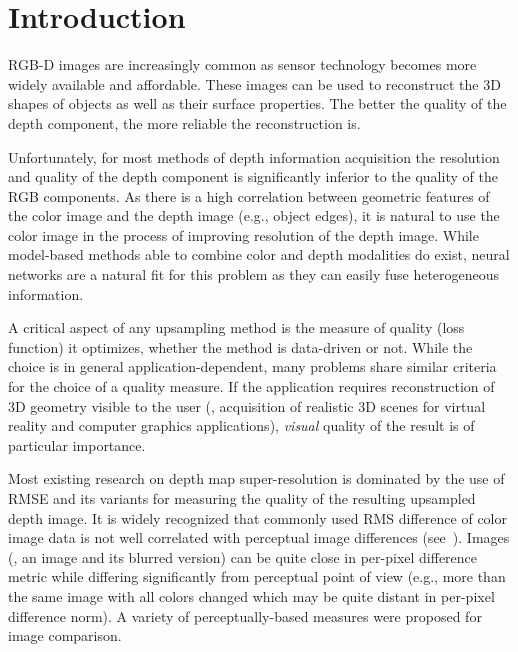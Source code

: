 \section{Introduction}
\label{sec:intro}

RGB-D images are increasingly common as sensor technology becomes more widely available and affordable. These images can be used to reconstruct the 3D shapes of objects as well as their surface properties. The better the quality of the depth component, the more reliable the reconstruction is. 

Unfortunately, for most methods of depth information acquisition the resolution and quality of the depth component is significantly inferior to the quality of the RGB components. As there is a high correlation between geometric features of the color image and the depth image (e.g., object edges), it is natural to use the color image in the process of improving resolution of the depth image. While model-based methods able to combine color and depth modalities do exist, neural networks are a natural fit for this problem as they can easily fuse heterogeneous information.

A critical aspect of any upsampling method is the measure of quality (loss function) it optimizes, whether the method is data-driven or not. While the choice is in general application-dependent, many problems share similar criteria for the choice of a quality measure. If the application requires reconstruction of 3D geometry visible to the user (\eg, acquisition of realistic 3D scenes for virtual reality and computer graphics applications), \emph{visual} quality of the result is of particular importance. 

Most existing research on depth map super-resolution is dominated by the use of RMSE and its variants for measuring the quality of the resulting upsampled depth image.
It is widely recognized that commonly used RMS difference of color image data is not well correlated with perceptual image differences (see~\cite{wang2009mean}). Images (\eg, an image and its blurred version) can be quite close in per-pixel difference metric while differing significantly from perceptual point of view (e.g., more than the same image with all colors changed which may be quite distant in per-pixel difference norm). A variety of perceptually-based measures were proposed for image comparison.  

